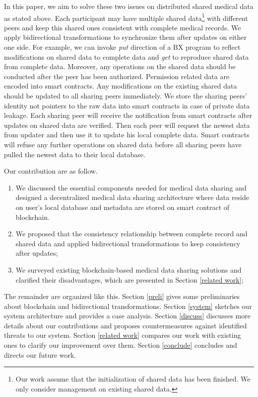 \documentclass[conference]{IEEEtran}
\begin{document}
In this paper, we aim to solve these two issues on distributed shared medical data as stated above. 
Each participant may have multiple shared data\footnote{Our work assume that the initialization of shared data has been finished. We only consider management on existing shared data.} with different peers and keep this shared ones consistent with complete medical records. We apply bidirectional transformations \cite{hu2014validity} to synchronize them after updates on either one side. For example, we can invoke \emph{put} direction of a  BX program to reflect modifications on shared data to complete data and \emph{get} to reproduce shared data from complete data. 
Moreover,  any operations on the shared data should be conducted after the peer has been authorized. Permission related data are encoded into smart contracts. Any modifications on the existing shared data should be updated to all sharing peers immediately. We store the sharing peers' identity not pointers to the raw data into smart contracts in case of private data leakage. Each sharing peer will receive the notification from smart contracts after updates on shared data are verified. Then each peer will request the newest data from updater and then use it to update his local complete data. Smart contracts will refuse any further operations on shared data before all sharing peers have pulled the newest data to their local database.

Our contribution are as follow.
\begin{enumerate}
	\item We discussed the essential components needed for medical data sharing and designed  a decentralized medical data sharing architecture where data reside on user's local database and metadata are stored on smart contract of  blockchain. 
	\item We proposed that the consistency relationship between complete record and shared data and applied bidirectional transformations to keep consistency after updates;
	\item We surveyed existing blockchain-based medical data sharing solutions and clarified their disadvantages, which are presented in Section \ref{related work};
\end{enumerate}

The remainder are organized like this. Section \ref{preli} gives some preliminaries about blockchain and bidirectional transformations. Section \ref{system} sketches our system architecture and provides a case analysis. Section \ref{discuss} discusses more details about our contributions and proposes countermeasures against identified threats to our system. Section \ref{related work} compares our work with existing ones to clarify our improvement over them. Section \ref{conclude} concludes and directs our future work.
\end{document}
